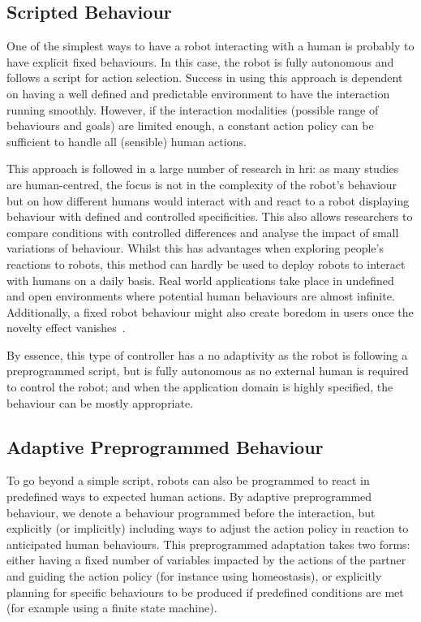 \subsection{Scripted Behaviour}

    One of the simplest ways to have a robot interacting with a human is probably to have explicit fixed behaviours. In this case, the robot is fully autonomous and follows a script for action selection. Success in using this approach is dependent on having a well defined and predictable environment to have the interaction running smoothly. However, if the interaction modalities (possible range of behaviours and goals) are limited enough, a constant action policy can be sufficient to handle all (sensible) human actions. 
    
    This approach is followed in a large number of research in \gls{hri}: as many studies are human-centred, the focus is not in the complexity of the robot's behaviour but on how different humans would interact with and react to a robot displaying behaviour with defined and controlled specificities. This also allows researchers to compare conditions with controlled differences and analyse the impact of small variations of behaviour. Whilst this has advantages when exploring people's reactions to robots, this method can hardly be used to deploy robots to interact with humans on a daily basis. Real world applications take place in undefined and open environments where potential human behaviours are almost infinite. Additionally, a fixed robot behaviour might also create boredom in users once the novelty effect vanishes~\citep{salter2004robots}.
  
    By essence, this type of controller has a no adaptivity as the robot is following a preprogrammed script, but is fully autonomous as no external human is required to control the robot; and when the application domain is highly specified, the behaviour can be mostly appropriate.

\subsection{Adaptive Preprogrammed Behaviour}
	
	To go beyond a simple script, robots can also be programmed to react in predefined ways to expected human actions. By adaptive preprogrammed behaviour, we denote a behaviour programmed before the interaction, but explicitly (or implicitly) including ways to adjust the action policy in reaction to anticipated human behaviours. This preprogrammed adaptation takes two forms: either having a fixed number of variables impacted by the actions of the partner and guiding the action policy (for instance using homeostasis), or explicitly planning for specific behaviours to be produced if predefined conditions are met (for example using a finite state machine).
	
